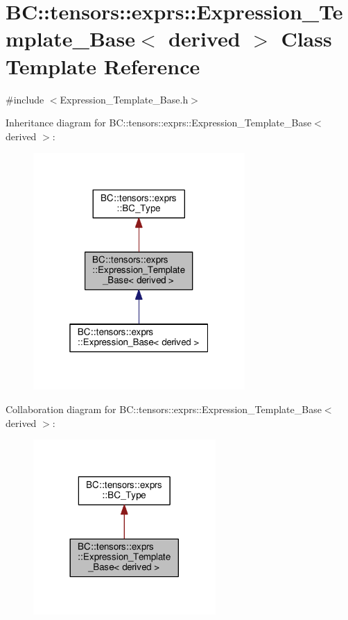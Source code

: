 \hypertarget{classBC_1_1tensors_1_1exprs_1_1Expression__Template__Base}{}\section{BC\+:\+:tensors\+:\+:exprs\+:\+:Expression\+\_\+\+Template\+\_\+\+Base$<$ derived $>$ Class Template Reference}
\label{classBC_1_1tensors_1_1exprs_1_1Expression__Template__Base}


{\ttfamily \#include $<$Expression\+\_\+\+Template\+\_\+\+Base.\+h$>$}



Inheritance diagram for BC\+:\+:tensors\+:\+:exprs\+:\+:Expression\+\_\+\+Template\+\_\+\+Base$<$ derived $>$\+:
\nopagebreak
\begin{figure}[H]
\begin{center}
\leavevmode
\includegraphics[width=229pt]{classBC_1_1tensors_1_1exprs_1_1Expression__Template__Base__inherit__graph}
\end{center}
\end{figure}


Collaboration diagram for BC\+:\+:tensors\+:\+:exprs\+:\+:Expression\+\_\+\+Template\+\_\+\+Base$<$ derived $>$\+:
\nopagebreak
\begin{figure}[H]
\begin{center}
\leavevmode
\includegraphics[width=197pt]{classBC_1_1tensors_1_1exprs_1_1Expression__Template__Base__coll__graph}
\end{center}
\end{figure}

